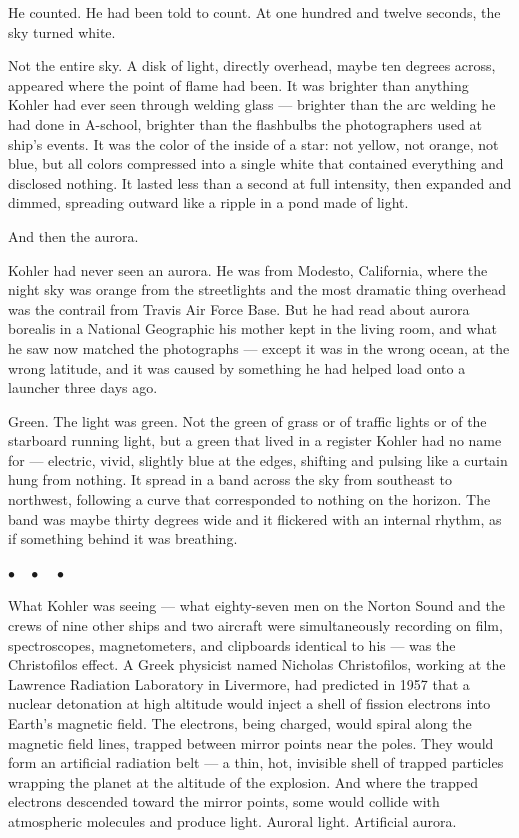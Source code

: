 \documentclass[12pt, letterpaper]{article}
\begin{document}
He counted. He had been told to count. At one hundred and twelve seconds, the sky turned white.

Not the entire sky. A disk of light, directly overhead, maybe ten degrees across, appeared where the point of flame had been. It was brighter than anything Kohler had ever seen through welding glass --- brighter than the arc welding he had done in A-school, brighter than the flashbulbs the photographers used at ship's events. It was the color of the inside of a star: not yellow, not orange, not blue, but all colors compressed into a single white that contained everything and disclosed nothing. It lasted less than a second at full intensity, then expanded and dimmed, spreading outward like a ripple in a pond made of light.

And then the aurora.

Kohler had never seen an aurora. He was from Modesto, California, where the night sky was orange from the streetlights and the most dramatic thing overhead was the contrail from Travis Air Force Base. But he had read about aurora borealis in a National Geographic his mother kept in the living room, and what he saw now matched the photographs --- except it was in the wrong ocean, at the wrong latitude, and it was caused by something he had helped load onto a launcher three days ago.

Green. The light was green. Not the green of grass or of traffic lights or of the starboard running light, but a green that lived in a register Kohler had no name for --- electric, vivid, slightly blue at the edges, shifting and pulsing like a curtain hung from nothing. It spread in a band across the sky from southeast to northwest, following a curve that corresponded to nothing on the horizon. The band was maybe thirty degrees wide and it flickered with an internal rhythm, as if something behind it was breathing.

\begin{center}
$\bullet\quad\bullet\quad\bullet$
\end{center}

What Kohler was seeing --- what eighty-seven men on the Norton Sound and the crews of nine other ships and two aircraft were simultaneously recording on film, spectroscopes, magnetometers, and clipboards identical to his --- was the Christofilos effect. A Greek physicist named Nicholas Christofilos, working at the Lawrence Radiation Laboratory in Livermore, had predicted in 1957 that a nuclear detonation at high altitude would inject a shell of fission electrons into Earth's magnetic field. The electrons, being charged, would spiral along the magnetic field lines, trapped between mirror points near the poles. They would form an artificial radiation belt --- a thin, hot, invisible shell of trapped particles wrapping the planet at the altitude of the explosion. And where the trapped electrons descended toward the mirror points, some would collide with atmospheric molecules and produce light. Auroral light. Artificial aurora.
\end{document}
